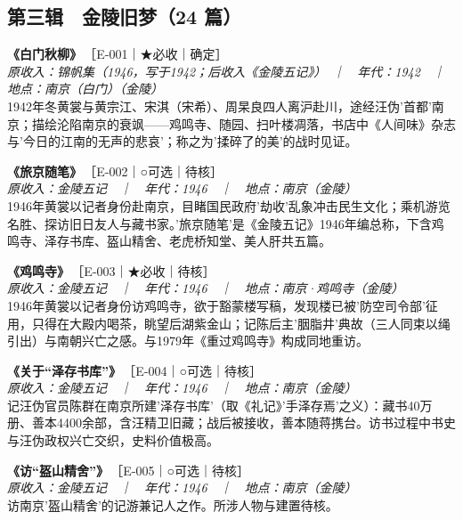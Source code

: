 \documentclass[UTF8,fontset=none,zihao=-4,a4paper]{ctexart}
\begin{document}
\subsection{第三辑　金陵旧梦（24 篇）}
\noindent\textbf{《白门秋柳》}\,{\small ［E-001｜★必收｜确定］}\\
{\small\itshape 原收入：锦帆集（1946，写于1942；后收入《金陵五记》）　｜　年代：1942　｜　地点：南京（白门）（金陵）}\\
1942年冬黄裳与黄宗江、宋淇（宋希）、周杲良四人离沪赴川，途经汪伪'首都'南京；描绘沦陷南京的衰飒——鸡鸣寺、随园、扫叶楼凋落，书店中《人间味》杂志与'今日的江南的无声的悲哀'；称之为'揉碎了的美'的战时见证。
\par\vspace{5pt}
\noindent\textbf{《旅京随笔》}\,{\small ［E-002｜○可选｜待核］}\\
{\small\itshape 原收入：金陵五记　｜　年代：1946　｜　地点：南京（金陵）}\\
1946年黄裳以记者身份赴南京，目睹国民政府'劫收'乱象冲击民生文化；乘机游览名胜、探访旧日友人与藏书家。'旅京随笔'是《金陵五记》1946年编总称，下含鸡鸣寺、泽存书库、盔山精舍、老虎桥知堂、美人肝共五篇。
\par\vspace{5pt}
\noindent\textbf{《鸡鸣寺》}\,{\small ［E-003｜★必收｜待核］}\\
{\small\itshape 原收入：金陵五记　｜　年代：1946　｜　地点：南京·鸡鸣寺（金陵）}\\
1946年黄裳以记者身份访鸡鸣寺，欲于豁蒙楼写稿，发现楼已被'防空司令部'征用，只得在大殿内喝茶，眺望后湖紫金山；记陈后主'胭脂井'典故（三人同束以绳引出）与南朝兴亡之感。与1979年《重过鸡鸣寺》构成同地重访。
\par\vspace{5pt}
\noindent\textbf{《关于“泽存书库”》}\,{\small ［E-004｜○可选｜待核］}\\
{\small\itshape 原收入：金陵五记　｜　年代：1946　｜　地点：南京（金陵）}\\
记汪伪官员陈群在南京所建'泽存书库'（取《礼记》'手泽存焉'之义）：藏书40万册、善本4400余部，含汪精卫旧藏；战后被接收，善本随蒋携台。访书过程中书史与汪伪政权兴亡交织，史料价值极高。
\par\vspace{5pt}
\noindent\textbf{《访“盔山精舍”》}\,{\small ［E-005｜○可选｜待核］}\\
{\small\itshape 原收入：金陵五记　｜　年代：1946　｜　地点：南京（金陵）}\\
访南京'盔山精舍'的记游兼记人之作。所涉人物与建置待核。
\par\vspace{5pt}
\end{document}

